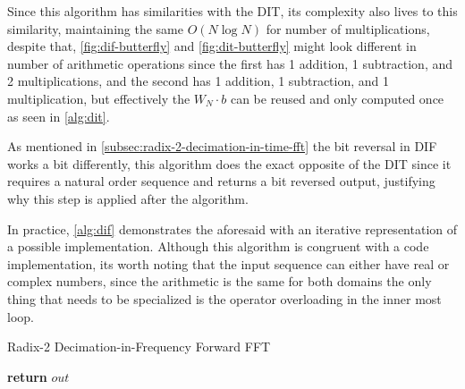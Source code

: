 \documentclass[
  oneside,
  11pt, a4paper,
  footinclude=true,
  headinclude=true,
  cleardoublepage=empty
]{scrbook}
\begin{document}
Since this algorithm has similarities with the DIT, its complexity also lives to this similarity, maintaining the same \(O(N \log{N})\) for number of multiplications, despite that, \autoref{fig:dif-butterfly} and \autoref{fig:dit-butterfly} might look different in number of arithmetic operations since the first has 1 addition, 1 subtraction, and 2 multiplications, and the second has 1 addition, 1 subtraction, and 1 multiplication, but effectively the \(W_{N} \cdot b\) can be reused and only computed once as seen in \autoref{alg:dit}.

As mentioned in \autoref{subsec:radix-2-decimation-in-time-fft} the bit reversal in DIF works a bit differently, this algorithm does the exact opposite of the DIT since it requires a natural order sequence and returns a bit reversed output, justifying why this step is applied after the algorithm.

In practice, \autoref{alg:dif} demonstrates the aforesaid with an iterative representation of a possible implementation. Although this algorithm is congruent with a code implementation, its worth noting that the input sequence can either have real or complex numbers, since the arithmetic is the same for both domains the only thing that needs to be specialized is the operator overloading in the inner most loop.

\begin{algorithm}[H]
    \caption{Radix-2 Decimation-in-Frequency Forward FFT} \label{alg:dif}

    

    \textbf{return} $out$\;
\end{algorithm}
\end{document}
